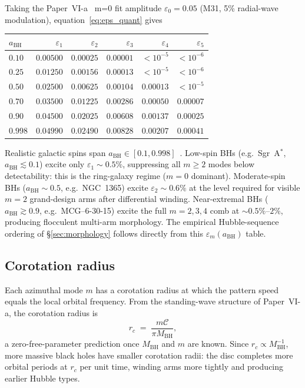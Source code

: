 \documentclass[11pt,a4paper]{article}
\begin{document}
\begin{resultbox}
Taking the Paper~VI-a~\cite{SSV-VIa} m=0 fit amplitude $\varepsilon_0 = 0.05$
(M31, 5\% radial-wave modulation), equation~\eqref{eq:eps_quant} gives
\begin{center}\small
\begin{tabular}{@{}lrrrrr@{}}
\toprule
$a_\mathrm{BH}$ & $\varepsilon_1$ & $\varepsilon_2$ & $\varepsilon_3$ &
$\varepsilon_4$ & $\varepsilon_5$ \\
\midrule
$0.10$  & $0.00500$ & $0.00025$ & $0.00001$ & ${<}10^{-5}$ & ${<}10^{-6}$ \\
$0.25$  & $0.01250$ & $0.00156$ & $0.00013$ & ${<}10^{-5}$ & ${<}10^{-6}$ \\
$0.50$  & $0.02500$ & $0.00625$ & $0.00104$ & $0.00013$ & ${<}10^{-5}$ \\
$0.70$  & $0.03500$ & $0.01225$ & $0.00286$ & $0.00050$ & $0.00007$ \\
$0.90$  & $0.04500$ & $0.02025$ & $0.00608$ & $0.00137$ & $0.00025$ \\
$0.998$ & $0.04990$ & $0.02490$ & $0.00828$ & $0.00207$ & $0.00041$ \\
\bottomrule
\end{tabular}
\end{center}
Realistic galactic spins span $a_\mathrm{BH}\in[0.1,0.998]$~\cite{reynolds2021}.
Low-spin BHs (e.g.\ Sgr~A${}^*$, $a_\mathrm{BH}\lesssim0.1$) excite only
$\varepsilon_1\sim0.5\%$, suppressing all $m\geq2$ modes below detectability:
this is the ring-galaxy regime ($m=0$ dominant).  Moderate-spin BHs
($a_\mathrm{BH}\sim0.5$, e.g.\ NGC~1365) excite $\varepsilon_2\sim0.6\%$ at the
level required for visible $m=2$ grand-design arms after differential winding.
Near-extremal BHs ($a_\mathrm{BH}\gtrsim0.9$, e.g.\ MCG--6-30-15) excite the
full $m=2,3,4$ comb at $\sim0.5\%$--$2\%$, producing flocculent multi-arm
morphology.  The empirical Hubble-sequence ordering of \S\ref{sec:morphology}
follows directly from this $\varepsilon_m(a_\mathrm{BH})$ table.
\end{resultbox}

\subsection{Corotation radius}

Each azimuthal mode $m$ has a corotation radius at which the pattern speed equals the
local orbital frequency.  From the standing-wave structure of Paper~VI-a, the corotation
radius is
\begin{equation}
  r_c \;=\; \frac{m\mathcal{C}}{\pi M_\mathrm{BH}},
  \label{eq:rc}
\end{equation}
a zero-free-parameter prediction once $M_\mathrm{BH}$ and $m$ are known.  Since
$r_c \propto M_\mathrm{BH}^{-1}$, more massive black holes have smaller corotation radii:
the disc completes more orbital periods at $r_c$ per unit time, winding arms more tightly
and producing earlier Hubble types.
\end{document}
